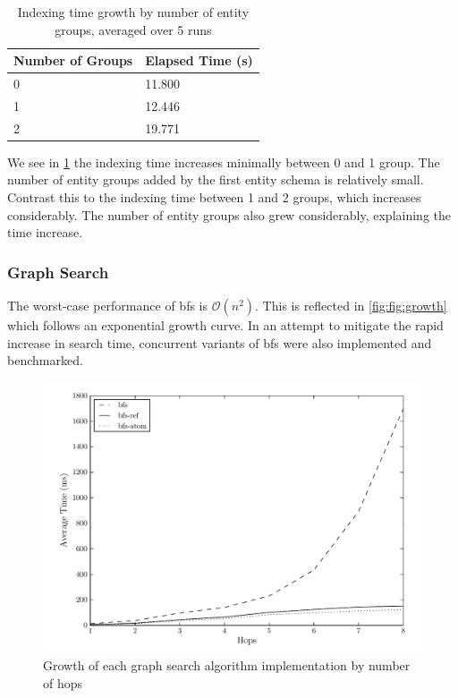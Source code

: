 				\begin{table}[H]
					\centering
					\begin{tabular}{ll}
						\toprule
						Number of Groups & Elapsed Time (s) \\
						\midrule
						0 & 11.800 \\
						1 & 12.446 \\
						2 & 19.771 \\
						\bottomrule
					\end{tabular}
					
					\caption{Indexing time growth by number of entity groups, averaged over 5 runs}
					\label{tbl:index-growth-entity-groups}
				\end{table}
				
				We see in \cref{tbl:index-growth-entity-groups} the indexing time increases minimally between 0 and 1 group.  The number of entity groups added by the first entity schema is relatively small.  Contrast this to the indexing time between 1 and 2 groups, which increases considerably.  The number of entity groups also grew considerably, explaining the time increase.
			
			\subsubsection{Graph Search}
				The worst-case performance of \gls{bfs} is \(\mathcal{O}(n^2)\).  This is reflected in \cref{fig:fig:growth} which follows an exponential growth curve.  In an attempt to mitigate the rapid increase in search time, concurrent variants of \gls{bfs} were also implemented and benchmarked.
				
				\begin{figure}[H]
					\centering
					\includegraphics[scale=0.9]{figures/charts/growth.pdf}
					\caption{Growth of each graph search algorithm implementation by number of hops}
					\label{fig:growth}
				\end{figure}
				
